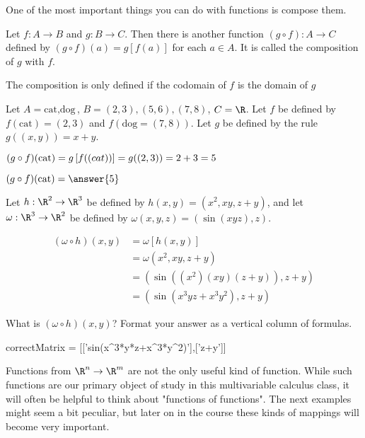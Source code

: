 One of the most important things you can do with functions is compose them.

\begin{definition}
	Let $f:A \to B$ and $g:B \to C$.  Then there is another function $(g \circ f): A \to C$ defined by $(g \circ f)(a) = g\left[f(a)\right]$ for each $a \in A$.
	It is called the composition of $g$ with $f$.
\end{definition}

\begin{warning}
	The composition is only defined if the codomain of $f$ is the domain of $g$
\end{warning}

\begin{question}
		Let $A = {\text{cat},\text{dog}}$, $B = {(2,3),(5,6),(7,8)}$, $C = \R$. Let $f$ be defined by $f(\text{cat}) = (2,3)$ and $f(\text{dog} = (7,8))$.  Let $g$ be defined by
		the rule $g((x,y)) = x+y$.  
		\begin{solution}
			\begin{hint}
				$(g \circ f)(\text{cat}) = g\left[f(\text(cat))\right] =g((2,3)) = 2+3=5$
			\end{hint}
			 $(g \circ f)(\text{cat}) = \answer{5}$
		\end{solution} 
\end{question}

\begin{question}
	Let $h: \R^2 \to \R^3$ be defined by $h(x,y) = (x^2,xy,z+y)$, and let $\omega: \R^3 \to \R^2$ be defined by $\omega(x,y,z) = (\sin(xyz),z)$.
	\begin{solution}
		\begin{hint}
			\begin{align*}
			(\omega\circ h)(x,y) &= \omega\left[h(x,y)\right]\\
			&= \omega(x^2,xy,z+y)\\
			&= (\sin((x^2)(xy)(z+y)), z+y)\\
			&=(\sin(x^3yz+x^3y^2),z+y)
			\end{align*}
		\end{hint}
		What is $(\omega\circ h)(x,y)$?  Format your answer as a vertical column of formulas.
		\begin{matrix-answer}
			correctMatrix = [['sin(x^3*y*z+x^3*y^2)'],['z+y']]
		\end{matrix-answer}
	\end{solution}
\end{question}

Functions from $\R^n \to \R^m$ are not the only useful kind of function.  While such functions are our primary object of study in 
this multivariable calculus class,  it will often be helpful to think about "functions of functions".  The next examples might seem a 
bit peculiar, but later on in the course these kinds of mappings will become very important.

